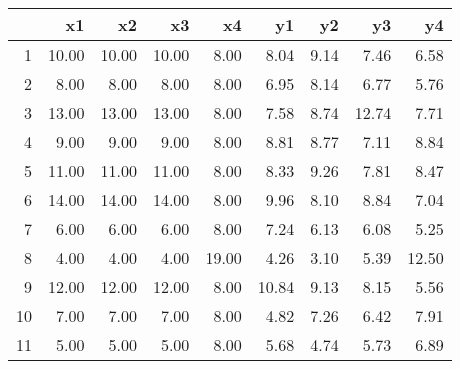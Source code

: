 \begin{table}[ht]
\centering
\begin{tabular}{rrrrrrrrr}
  \hline
 & x1 & x2 & x3 & x4 & y1 & y2 & y3 & y4 \\ 
  \hline
1 & 10.00 & 10.00 & 10.00 & 8.00 & 8.04 & 9.14 & 7.46 & 6.58 \\ 
  2 & 8.00 & 8.00 & 8.00 & 8.00 & 6.95 & 8.14 & 6.77 & 5.76 \\ 
  3 & 13.00 & 13.00 & 13.00 & 8.00 & 7.58 & 8.74 & 12.74 & 7.71 \\ 
  4 & 9.00 & 9.00 & 9.00 & 8.00 & 8.81 & 8.77 & 7.11 & 8.84 \\ 
  5 & 11.00 & 11.00 & 11.00 & 8.00 & 8.33 & 9.26 & 7.81 & 8.47 \\ 
  6 & 14.00 & 14.00 & 14.00 & 8.00 & 9.96 & 8.10 & 8.84 & 7.04 \\ 
  7 & 6.00 & 6.00 & 6.00 & 8.00 & 7.24 & 6.13 & 6.08 & 5.25 \\ 
  8 & 4.00 & 4.00 & 4.00 & 19.00 & 4.26 & 3.10 & 5.39 & 12.50 \\ 
  9 & 12.00 & 12.00 & 12.00 & 8.00 & 10.84 & 9.13 & 8.15 & 5.56 \\ 
  10 & 7.00 & 7.00 & 7.00 & 8.00 & 4.82 & 7.26 & 6.42 & 7.91 \\ 
  11 & 5.00 & 5.00 & 5.00 & 8.00 & 5.68 & 4.74 & 5.73 & 6.89 \\ 
   \hline
\end{tabular}
\end{table}
